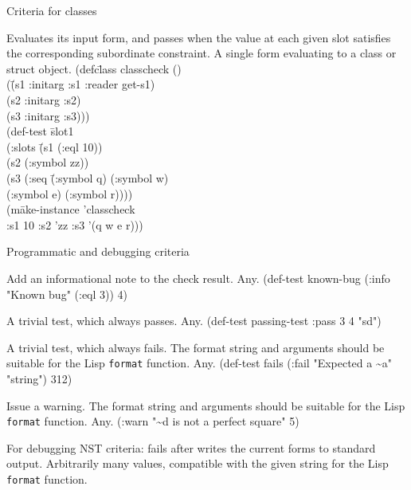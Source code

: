 \begin{criteriaGroup}{Criteria for classes}{}

{Evaluates its input form, and passes when the value at each given
slot satisfies the corresponding subordinate constraint.}
{A single form evaluating to a class or struct object.}
{}
{\tabbingEx}{
(defc\=lass classcheck ()
\\ \> (\=(s1 :initarg :s1 :reader get-s1)
\\ \> \> (s2 :initarg :s2)
\\ \> \> (s3 :initarg :s3)))
\\ (def-test \=slot1
\\ \>  (:slots \=(s1 (:eql 10))
\\ \>  \>(s2 (:symbol zz))
\\ \>  \>(s3 (:seq \=(:symbol q) (:symbol w)
\\ \>  \> \> (:symbol e) (:symbol r))))
\\ \>  (m\=ake-instance 'classcheck
\\ \> \>  :s1 10 :s2 'zz :s3 '(q w e r)))
}

\end{criteriaGroup}

\begin{criteriaGroup}{Programmatic and debugging criteria}{}

{Add an informational note to the check result.}
{Any.}
{\noExpl}
{\singleEx}{(def-test known-bug (:info "Known bug" (:eql 3)) 4)}

{A trivial test, which always passes.}
{Any.}
{\noExpl}
{\singleEx}{(def-test passing-test :pass 3 4 "sd")}

{A trivial test, which always fails.  The format string and arguments
should be suitable for the Lisp \texttt{format} function.}
{Any.}
{\noExpl}
{\singleEx}{(def-test fails (:fail "Expected a \~{}a" "string") 312)}

{Issue a warning.  The format string and arguments should be suitable for
 the Lisp \texttt{format} function.}
{Any.}
{\noExpl}
{\singleEx}{(:warn "\~{}d is not a perfect square" 5)}

{For debugging NST criteria: fails after writes the current forms to
standard output.}
{Arbitrarily many values, compatible with the given string for the
Lisp \texttt{format} function.}
{\noExpl}{\noEx}{}

\end{criteriaGroup}

